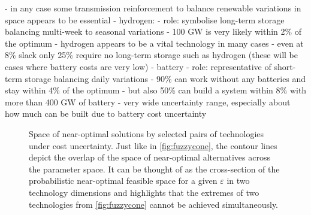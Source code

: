   - in any case some transmission reinforcement to balance renewable variations in space appears to be essential 
- hydrogen:
  - role: symbolise long-term storage balancing multi-week to seasonal variations
  - 100 GW is very likely within 2\% of the optimum
  - hydrogen appears to be a vital technology in many cases
  - even at 8\% slack only 25\% require no long-term storage such as hydrogen (these will be cases where battery costs are very low)
- battery
  - role: representative of short-term storage balancing daily variations
  - 90\% can work without any batteries and stay within 4\% of the optimum
  - but also 50\% can build a system within 8\% with more than 400 GW of battery
  - very wide uncertainty range, especially about how much can be built due to battery cost uncertainty


\begin{figure}
    \noindent{}
    \caption{
      Space of near-optimal solutions by selected pairs of technologies under cost uncertainty.
    Just like in \cref{fig:fuzzycone}, the contour lines depict the overlap of the space of near-optimal alternatives across the parameter space.
    It can be thought of as the cross-section of the probabilistic near-optimal feasible space for a given $\varepsilon$
    in two technology dimensions and highlights that the extremes of two technologies from \cref{fig:fuzzycone} cannot be achieved simultaneously.
    }
    \label{fig:dependencies}
\end{figure}

